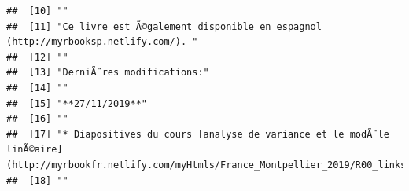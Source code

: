 \documentclass[]{book}
\begin{document}
\begin{verbatim}
##  [10] ""                                                                                                                                                                                                                                                                                                           
##  [11] "Ce livre est Ã©galement disponible en espagnol (http://myrbooksp.netlify.com/). "                                                                                                                                                                                                                           
##  [12] ""                                                                                                                                                                                                                                                                                                           
##  [13] "DerniÃ¨res modifications:"                                                                                                                                                                                                                                                                                  
##  [14] ""                                                                                                                                                                                                                                                                                                           
##  [15] "**27/11/2019**"                                                                                                                                                                                                                                                                                             
##  [16] ""                                                                                                                                                                                                                                                                                                           
##  [17] "* Diapositives du cours [analyse de variance et le modÃ¨le linÃ©aire](http://myrbookfr.netlify.com/myHtmls/France_Montpellier_2019/R00_links.html)"                                                                                                                                                         
##  [18] ""                                                                                                                                                                                                                                                                                                           

\end{verbatim}
\end{document}
